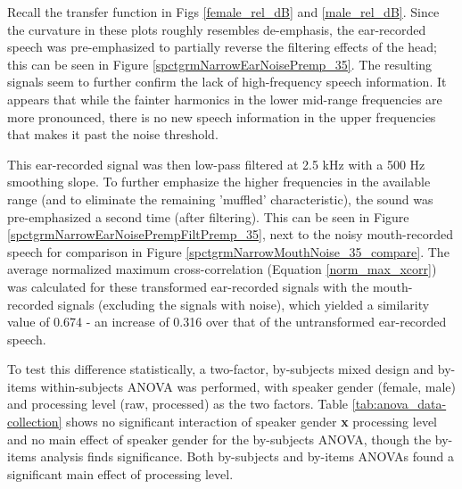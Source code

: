 Recall the transfer function in Figs \ref{female_rel_dB} and \ref{male_rel_dB}.  Since the curvature in these plots roughly resembles de-emphasis, the ear-recorded speech was pre-emphasized to partially reverse the filtering effects of the head; this can be seen in Figure \ref{spctgrmNarrowEarNoisePremp_35}. The resulting signals seem to further confirm the lack of high-frequency speech information. It appears that while the fainter harmonics in the lower mid-range frequencies are more pronounced, there is no new speech information in the upper frequencies that makes it past the noise threshold.

This ear-recorded signal was then low-pass filtered at 2.5 kHz with a 500 Hz smoothing slope. To further emphasize the higher frequencies in the available range (and to eliminate the remaining 'muffled' characteristic), the sound was pre-emphasized a second time (after filtering).  This can be seen in Figure \ref{spctgrmNarrowEarNoisePrempFiltPremp_35}, next to the noisy mouth-recorded speech for comparison in Figure \ref{spctgrmNarrowMouthNoise_35_compare}.  The average normalized maximum cross-correlation (Equation \ref{norm_max_xcorr}) was calculated for these transformed ear-recorded signals with the mouth-recorded signals (excluding the signals with noise), which yielded a similarity value of 0.674 - an increase of 0.316 over that of the untransformed ear-recorded speech.

To test this difference statistically, a two-factor, by-subjects mixed design and by-items within-subjects ANOVA was performed, with speaker gender (female, male) and processing level (raw, processed) as the two factors.  Table \ref{tab:anova_data-collection} shows no significant interaction of speaker gender \textbf{x} processing level and no main effect of speaker gender for the by-subjects ANOVA, though the by-items analysis finds significance.  Both by-subjects and by-items ANOVAs found a significant main effect of processing level.




